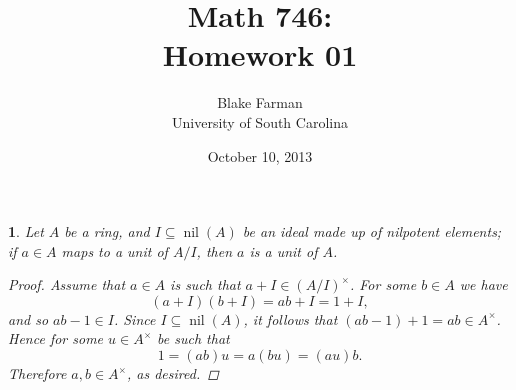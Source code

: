 \documentclass[10pt]{amsart}
\author{Blake Farman\\University of South Carolina}
\title{Math 746:\\Homework 01}
\date{October 10, 2013}
\begin{document}
\maketitle

\providecommand{\p}{\mathfrak{p}}
\providecommand{\m}{\mathfrak{m}}

\newtheorem{thm}{}
\newtheorem{lem}{Lemma}
\newtheorem{prop}{Proposition}
\theoremstyle{definition}
\newtheorem{defn}{Definition}

\newcommand{\A}{\mathbb{A}}
\newcommand{\nil}[1]{\operatorname{nil}{\left(#1\right)}}
\providecommand{\rad}[1]{\operatorname{rad}{\left( #1 \right)}}

\begin{thm}
  Let $A$ be a ring, and $I \subseteq \nil{A}$ be an ideal made up of nilpotent elements; if $a \in A$ maps to a unit of $A / I$, then $a$ is a unit of $A$.

  \begin{proof}
    Assume that $a \in A$ is such that $a + I \in (A/I)^\times$.
    For some $b \in A$ we have
    $$(a + I)(b + I) = ab + I = 1 + I,$$
    and so $ab - 1 \in I$.
    Since $I \subseteq \nil{A}$, it follows that $(ab - 1) + 1 = ab \in A^\times$.
    Hence for some $u \in A^\times$ be such that
    $$1 = (ab)u = a(bu) = (au)b.$$
    Therefore  $a, b \in A^\times$, as desired.
  \end{proof}
\end{thm}
\end{document}
